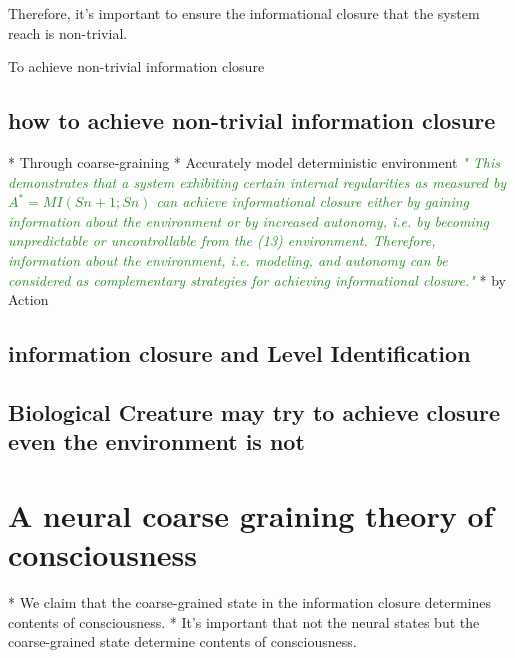 \documentclass[utf8]{article}
\newcommand{\rewrite}[1]{\textcolor{ForestGreen}{\textit{"#1"}}\newline}
\begin{document}
			Therefore, it's important to ensure the informational closure that the system reach is non-trivial.
		
			To achieve non-trivial information closure
			\citep{BERTSCHINGER.2006}\\
			\citep{guttenberg2016neural}
		
		
		
		
		\subsection{how to achieve non-trivial information closure}
			* Through coarse-graining
			* Accurately model deterministic environment 
				\rewrite{
					This demonstrates that a system exhibiting certain internal regularities as measured by $A^* = MI(Sn+1; Sn)$ can achieve informational closure either by gaining information about the environment or by increased autonomy, i.e. by becoming unpredictable or uncontrollable from the (13) environment. Therefore, information about the environment, i.e. modeling, and autonomy can be considered as complementary strategies for achieving informational closure.}
			* by Action 
		
		\subsection{information closure and Level Identification}	
		
		
		\subsection{Biological Creature may try to achieve closure even the environment is not }
		
	\section{A neural coarse graining theory of consciousness}
		* We claim that the coarse-grained state in the information closure determines contents of 
		consciousness. 
		* It's important that not the neural states but the coarse-grained state determine contents
		of consciousness. 
		   
\end{document}

